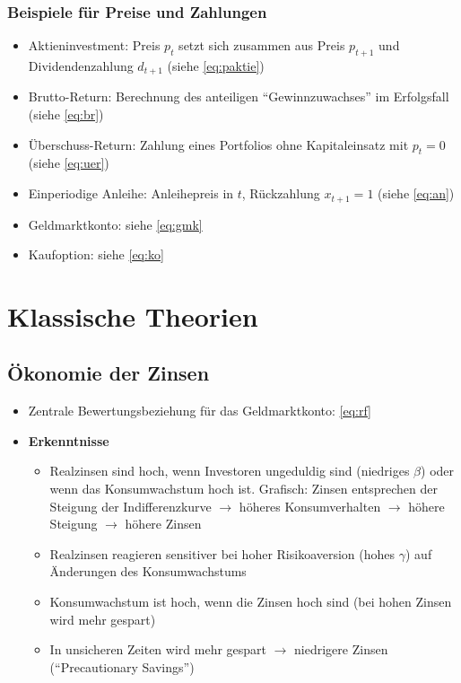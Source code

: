 \subsubsection{Beispiele für Preise und Zahlungen}
\begin{itemize}
	\item Aktieninvestment: Preis \(p_t\) setzt sich zusammen aus Preis \(p_{t+1}\) und Dividendenzahlung \(d_{t+1}\) (siehe \ref{eq:paktie})
	\item Brutto-Return: Berechnung des anteiligen "`Gewinnzuwachses"' im Erfolgsfall (siehe \ref{eq:br})
	\item Überschuss-Return: Zahlung eines Portfolios ohne Kapitaleinsatz mit \(p_t=0\) (siehe \ref{eq:uer})
	\item Einperiodige Anleihe: Anleihepreis in \(t\), Rückzahlung \(x_{t+1}=1\) (siehe \ref{eq:an})
	\item Geldmarktkonto: siehe \ref{eq:gmk}
	\item Kaufoption: siehe \ref{eq:ko}
\end{itemize}



\section{Klassische Theorien}

\subsection{Ökonomie der Zinsen}
\begin{itemize}
	\item Zentrale Bewertungsbeziehung für das Geldmarktkonto: \ref{eq:rf}
	\item \textbf{Erkenntnisse}
	\begin{itemize}
		\item Realzinsen sind hoch, wenn Investoren ungeduldig sind (niedriges \(\beta\)) oder wenn das Konsumwachstum hoch ist. Grafisch: Zinsen entsprechen der Steigung der Indifferenzkurve \(\rightarrow\) höheres Konsumverhalten \(\rightarrow\) höhere Steigung \(\rightarrow\) höhere Zinsen
		\item Realzinsen reagieren sensitiver bei hoher Risikoaversion (hohes \(\gamma\)) auf Änderungen des Konsumwachstums
		\item Konsumwachstum ist hoch, wenn die Zinsen hoch sind (bei hohen Zinsen wird mehr gespart)
		\item In unsicheren Zeiten wird mehr gespart \(\rightarrow\) niedrigere Zinsen ("`Precautionary Savings"')
	\end{itemize}
\end{itemize}


